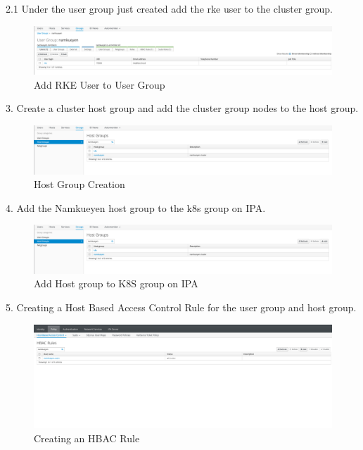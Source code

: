 2.1 Under the user group just created add the rke user to the cluster group.

\begin{figure}
    \includegraphics[width=12cm]{Images/Image21.png}
    \centering
    \caption{Add RKE User to User Group}
\end{figure}


3. Create a cluster host group and add the cluster group nodes to the host group. 

\begin{figure}
    \includegraphics[width=12cm]{Images/Image20.png}
    \centering
    \caption{Host Group Creation}
\end{figure}

4.  Add the Namkueyen host group to the k8s group on IPA.

\begin{figure}
    \includegraphics[width=12cm]{Images/Image20.png}
    \centering
    \caption{Add Host group to K8S group on IPA}
\end{figure}

5. Creating a Host Based Access Control Rule for the user group and host group.

\begin{figure}
    \includegraphics[width=12cm]{Images/Image23.png}
    \centering
    \caption{Creating an HBAC Rule}
\end{figure}


